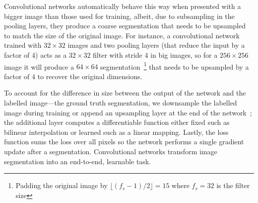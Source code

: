 Convolutional networks automatically behave this way when presented with a bigger image than those used for training, albeit, due to subsampling in the pooling layers, they produce a coarse segmentation that needs to be upsampled to match the size of the original image.
For instance, a convolutional network trained with $32\times 32$ images and two pooling layers (that reduce the input by a factor of 4) acts as a $32 \times 32$ filter with stride 4 in big images, so for a $256 \times 256$ image it will produce a $64 \times 64$ segmentation~\footnote{Padding the original image by $\lfloor (f_s-1)/2\rfloor = 15$ where $f_s = 32$ is the filter size} that needs to be upsampled by a factor of 4 to recover the original dimensions.

To account for the difference in size between the output of the network and the labelled image---the ground truth segmentation\textemdash, we downsample the labelled image during training or append an upsampling layer at the end of the network~\cite{Long2015}; the additional layer computes a differentiable function either fixed such as bilinear interpolation or learned such as a linear mapping.
Lastly, the loss function sums the loss over all pixels so the network performs a single gradient update after a segmentation. 
Convolutional networks transform image segmentation into an end-to-end, learnable task.

